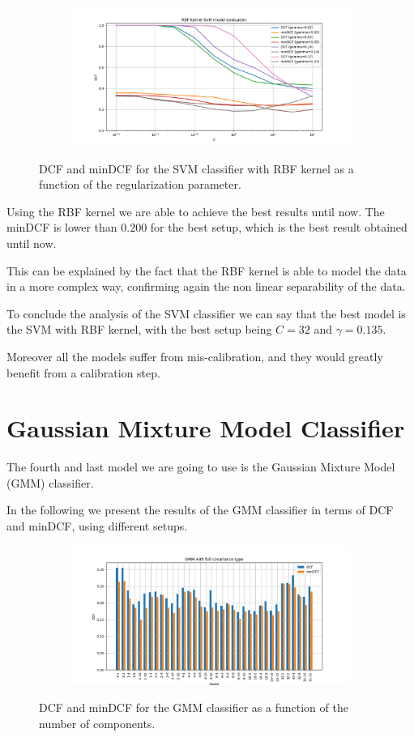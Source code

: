 \documentclass[12pt]{report}
\newcommand{\nnl}{%
    \newline
    \newline
}
\newcommand{\nl}{%
    \newline
    \noindent
}
\begin{document}
\begin{figure}[H]
    \centering
    \begin{subfigure}[t]{0.6\textwidth}
        \includegraphics[width=\textwidth]{./plot/SVM/svm_rbf.png}
    \end{subfigure}
    \caption{DCF and minDCF for the SVM classifier with RBF kernel as a function of the regularization parameter.}
    \label{fig:svm_rbf}
\end{figure}
\noindent
Using the RBF kernel we are able to achieve the best results until now. The minDCF is lower than 0.200 for the best setup, which is the best result obtained until now.
\nl
This can be explained by the fact that the RBF kernel is able to model the data in a more complex way, confirming again the non linear separability of the data.
\nnl
To conclude the analysis of the SVM classifier we can say that the best model is the SVM with RBF kernel, with the best setup being $C=32$ and $\gamma=0.135$.
\nl
Moreover all the models suffer from mis-calibration, and they would greatly benefit from a calibration step.

\section{Gaussian Mixture Model Classifier}
The fourth and last model we are going to use is the Gaussian Mixture Model (GMM) classifier.
\nnl
In the following we present the results of the GMM classifier in terms of DCF and minDCF, using different setups.

\begin{figure}[H]
    \centering
    \begin{subfigure}[t]{0.6\textwidth}
        \includegraphics[width=\textwidth]{./plot/GMM/gmm_full.png}
    \end{subfigure}
    \caption{DCF and minDCF for the GMM classifier as a function of the number of components.}
    \label{fig:gmm}
\end{figure}
\end{document}
